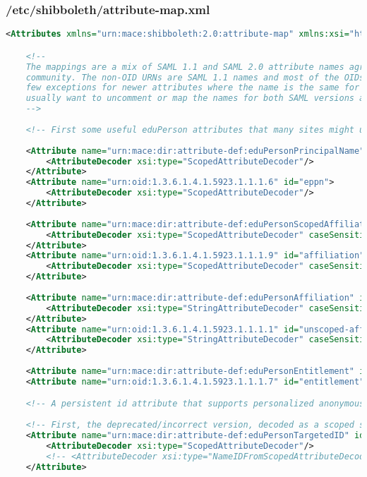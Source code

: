 \subsubsection{/etc/shibboleth/attribute-map.xml}
\begin{lstlisting}[language=xml]
<Attributes xmlns="urn:mace:shibboleth:2.0:attribute-map" xmlns:xsi="http://www.w3.org/2001/XMLSchema-instance">

    <!--
    The mappings are a mix of SAML 1.1 and SAML 2.0 attribute names agreed to within the Shibboleth
    community. The non-OID URNs are SAML 1.1 names and most of the OIDs are SAML 2.0 names, with a
    few exceptions for newer attributes where the name is the same for both versions. You will
    usually want to uncomment or map the names for both SAML versions as a unit.
    -->
    
    <!-- First some useful eduPerson attributes that many sites might use. -->
    
    <Attribute name="urn:mace:dir:attribute-def:eduPersonPrincipalName" id="eppn">
        <AttributeDecoder xsi:type="ScopedAttributeDecoder"/>
    </Attribute>
    <Attribute name="urn:oid:1.3.6.1.4.1.5923.1.1.1.6" id="eppn">
        <AttributeDecoder xsi:type="ScopedAttributeDecoder"/>
    </Attribute>
    
    <Attribute name="urn:mace:dir:attribute-def:eduPersonScopedAffiliation" id="affiliation">
        <AttributeDecoder xsi:type="ScopedAttributeDecoder" caseSensitive="false"/>
    </Attribute>
    <Attribute name="urn:oid:1.3.6.1.4.1.5923.1.1.1.9" id="affiliation">
        <AttributeDecoder xsi:type="ScopedAttributeDecoder" caseSensitive="false"/>
    </Attribute>
    
    <Attribute name="urn:mace:dir:attribute-def:eduPersonAffiliation" id="unscoped-affiliation">
        <AttributeDecoder xsi:type="StringAttributeDecoder" caseSensitive="false"/>
    </Attribute>
    <Attribute name="urn:oid:1.3.6.1.4.1.5923.1.1.1.1" id="unscoped-affiliation">
        <AttributeDecoder xsi:type="StringAttributeDecoder" caseSensitive="false"/>
    </Attribute>
    
    <Attribute name="urn:mace:dir:attribute-def:eduPersonEntitlement" id="entitlement"/>
    <Attribute name="urn:oid:1.3.6.1.4.1.5923.1.1.1.7" id="entitlement"/>

    <!-- A persistent id attribute that supports personalized anonymous access. -->
    
    <!-- First, the deprecated/incorrect version, decoded as a scoped string: -->
    <Attribute name="urn:mace:dir:attribute-def:eduPersonTargetedID" id="targeted-id">
        <AttributeDecoder xsi:type="ScopedAttributeDecoder"/>
        <!-- <AttributeDecoder xsi:type="NameIDFromScopedAttributeDecoder" formatter="$NameQualifier!$SPNameQualifier!$Name" defaultQualifiers="true"/> -->
    </Attribute>
    

\end{lstlisting}
